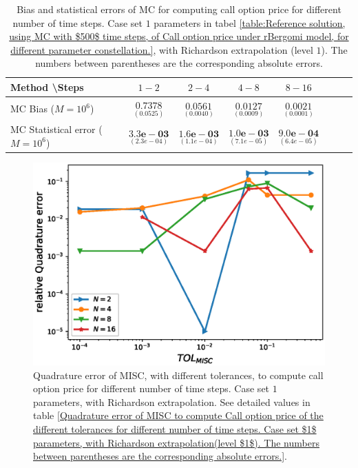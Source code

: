 \begin{table}[h!]
	\centering
	\begin{tabular}{l*{6}{c}r}
		Method \textbackslash  Steps            & $1-2$ & $2-4$ & $4-8$ & $8-16$  \\
		\hline
		MC  Bias ($M=10^6$)    &$\underset{( 0.0525)}{\mathbf{0.7378}}$  & $\underset{(    0.0040)}{\mathbf{0.0561}}$  & $\underset{(0.0009 )}{\mathbf{0.0127}}$  & $\underset{(0.0001)}{\mathbf{0.0021}}$ \\	
		
		MC Statistical error ($M=10^6$)   & $\underset{( 2.3e-04)}{\mathbf{3.3e-03}}$  & $\underset{(  1.1e-04)}{\mathbf{1.6e-03}}$  & $\underset{(7.1e-05)}{\mathbf{1.0e-03}}$ & $\underset{(   6.4e-05 )}{\mathbf{9.0e-04}}$ \\	
		
		
		\hline
	\end{tabular}
	\caption{Bias and statistical errors of MC   for computing call option price  for different number of time steps. Case set $1$ parameters in tabel \ref{table:Reference solution, using MC with $500$ time steps, of Call option price under rBergomi model, for different parameter constellation.}, with Richardson extrapolation (level $1$). The numbers between parentheses are the corresponding absolute errors.}
	\label{Bias and Statistical errors of MC ($M=10^6$)  for computing Call option price  for different number of time steps. Case set $1$ parameters, with Richardson extrapolation (level1). The numbers between parentheses are the corresponding absolute errors.}
\end{table}








\begin{figure}[h!]
	\centering
	\includegraphics[width=0.4\linewidth]{./figures/rBergomi_MISC_quadratre_error/vs_TOL/set1/relative_quad_error_wrt_MISC_TOL_set1_with_rich}
	
	
	\caption{Quadrature error of MISC, with different tolerances, to compute call option price for different number of time steps. Case  set $1$ parameters, with Richardson extrapolation.  See detailed values  in table \ref{Quadrature error of MISC to compute Call option price of the different tolerances for different number of time steps. Case set $1$ parameters, with Richardson extrapolation(level $1$). The numbers between parentheses are the corresponding absolute errors.}.}
\end{figure}



